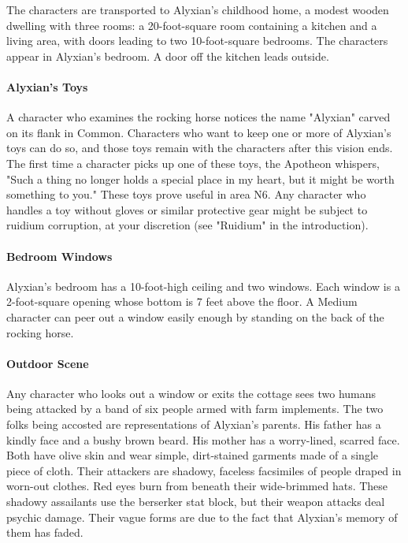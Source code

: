 \documentclass[10pt,a4paper,twoside,twocolumn,openany,nodeprecatedcode]{dndbook}
\begin{document}
The characters are transported to Alyxian's childhood home, a modest wooden dwelling with three rooms: a 20-foot-square room containing a kitchen and a living area, with doors leading to two 10-foot-square bedrooms. The characters appear in Alyxian's bedroom. A door off the kitchen leads outside.

\paragraph{Alyxian's Toys}
A character who examines the rocking horse notices the name "Alyxian" carved on its flank in Common. Characters who want to keep one or more of Alyxian's toys can do so, and those toys remain with the characters after this vision ends. The first time a character picks up one of these toys, the Apotheon whispers, "Such a thing no longer holds a special place in my heart, but it might be worth something to you." These toys prove useful in area N6. Any character who handles a toy without gloves or similar protective gear might be subject to ruidium corruption, at your discretion (see "Ruidium" in the introduction).

\paragraph{Bedroom Windows}
Alyxian's bedroom has a 10-foot-high ceiling and two windows. Each window is a 2-foot-square opening whose bottom is 7 feet above the floor. A Medium character can peer out a window easily enough by standing on the back of the rocking horse.

\paragraph{Outdoor Scene}
Any character who looks out a window or exits the cottage sees two humans being attacked by a band of six people armed with farm implements. The two folks being accosted are representations of Alyxian's parents. His father has a kindly face and a bushy brown beard. His mother has a worry-lined, scarred face. Both have olive skin and wear simple, dirt-stained garments made of a single piece of cloth. Their attackers are shadowy, faceless facsimiles of people draped in worn-out clothes. Red eyes burn from beneath their wide-brimmed hats. These shadowy assailants use the berserker stat block, but their weapon attacks deal psychic damage. Their vague forms are due to the fact that Alyxian's memory of them has faded.
\end{document}
